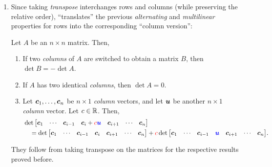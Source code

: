 \begin{enumerate}
\item Since taking \emph{transpose} interchanges rows and columns (while
preserving the relative order),  ``translates''
the previous \emph{alternating} and \emph{multilinear} properties for rows
into the corresponding ``column version'':
\begin{proposition}
\label{prp:det-alter-multilinear-col-version}
Let \(A\) be an \(n\times n\) matrix. Then,
\begin{enumerate}
\item \label{it:det-alter-col}If two \emph{columns} of \(A\) are switched to obtain a matrix \(B\), then \(\det B=-\det A\).
\item \label{it:two-identical-cols-zero-det}If \(A\) has two identical \emph{columns}, then \(\det A=0\).
\item\label{it:det-multilinear-col} Let \(\vb*{c}_{1},\dotsc,\vb*{c}_{n}\) be \(n\times 1\) \emph{column}
vectors, and let \(\vb*{u}\) be another \(n\times 1\) \emph{column} vector.
Let \(c\in\mathbb{R}\). Then,
\begin{align*}
&\det\mqty[\vect{c}_{1}&\cdots& \vect{c}_{i-1}& \vect{c}_{i}+\rc{c}\blc{\vect{u}}&
\vect{c}_{i+1}& \cdots& \vect{c}_{n}]\\
&\quad=
\det\mqty[\vect{c}_{1}&\cdots& \vect{c}_{i-1}& \vect{c}_{i}&
\vect{c}_{i+1}& \cdots& \vect{c}_{n}]
+\rc{c}\det\mqty[\vect{c}_{1}&\cdots& \vect{c}_{i-1}& \blc{\vect{u}}&
\vect{c}_{i+1}& \cdots& \vect{c}_{n}].
\end{align*}
\end{enumerate}
\end{proposition}
\begin{pf}
They follow from taking transpose on the matrices for the respective results
proved before.
\end{pf}


\end{enumerate}
